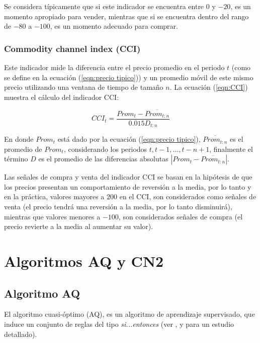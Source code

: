 \documentclass[12pt]{scrbook}
\theoremstyle{break}
\theoremstyle{break}
\begin{document}
Se considera típicamente que si este indicador se encuentra entre $0$ y $-20$, es un momento apropiado para vender, mientras que si se encuentra dentro del rango de $-80$ a $-100$, es un momento adecuado para comprar.

\subsubsection{Commodity channel index (CCI)}
\label{subsubseccion:cci}
Este indicador mide la diferencia entre el precio promedio en el periodo $t$ (como se define en la ecuación (\ref{eqn:precio tipico})) y un promedio móvil de este mismo precio utilizando una ventana de tiempo de tamaño $n$. La ecuación (\ref{eqn:CCI}) muestra el cálculo del indicador CCI:

\begin{equation} \label{eqn:CCI}
CCI_t = \dfrac{ Prom_t - \overline{Prom_{t:n}} }{ 0.015 D_{t:n}}
\end{equation}

En donde $Prom_t$ está dado por la ecuación (\ref{eqn:precio tipico}), $\overline{Prom_{t:n}}$ es el promedio de $Prom_t$, considerando los periodos $t, t-1, \ldots, t-n +1$, finalmente el término $D$ es el promedio de las diferencias absolutas $\left|Prom_t - \overline{Prom_{t:n}}  \right|$.

Las señales de compra y venta del indicador CCI se basan en la hipótesis de que los precios presentan un comportamiento de reversión a la media, por lo tanto y en la práctica, valores mayores a $200$ en el CCI, son considerados como señales de venta (el precio tendrá una reversión a la media, por lo tanto disminuirá), mientras que valores menores a $-100$, son considerados señales de compra (el precio revierte a la media al aumentar su valor).

\section{Algoritmos AQ y CN2}
\label{seccion:algoritmos aq cn2}

\subsection{Algoritmo AQ}
\label{subseccion:algoritmo aq}
El algoritmo cuasi-óptimo (AQ), es un algoritmo de aprendizaje supervisado, que induce un conjunto de reglas del tipo \textit{si...entonces} (ver \cite{AQCervone2010}, \cite{AQMichalski1991} y \cite{AQWojtusiak2012} para un estudio detallado). 
\end{document}
